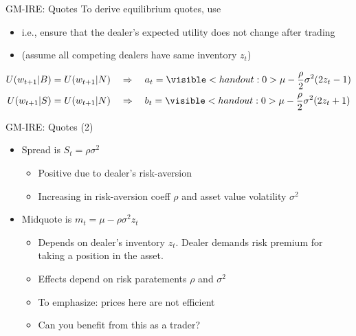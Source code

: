 \documentclass[english,10pt
,aspectratio=169
]{beamer}
\begin{document}
\begin{frame}{GM-IRE: Quotes}
	To derive equilibrium \alert{quotes}, use 
	\begin{itemize}
		\item i.e., ensure that the dealer's expected utility does not change after trading
		\item (assume all competing dealers have same inventory $z_t$)
	\end{itemize}
		\begin{align*}
			U(w_{t+1}|B)=U(w_{t+1}|N) \quad & \Rightarrow \quad a_t = \visible<handout:0>{ \mu -\frac{\rho}{2} \sigma^2 (2z_t - 1) }
			\\
			U(w_{t+1}|S)=U(w_{t+1}|N) \quad & \Rightarrow \quad b_t = \visible<handout:0>{ \mu -\frac{\rho}{2} \sigma^2 (2z_t + 1) }
		\end{align*}
\end{frame}


\begin{frame}{GM-IRE: Quotes (2)}
	\begin{itemize}
		\item \alert{Spread} is $S_t = \rho \sigma^2 $
		\begin{itemize}
			\item Positive due to dealer's risk-aversion
			\item Increasing in risk-aversion coeff $\rho$ and asset value volatility $\sigma^2$
		\end{itemize}
		\pause
		\item \alert{Midquote} is $m_t = \mu - \rho \sigma^2 z_t$
		\begin{itemize}
			\item Depends on dealer's inventory $z_t$. Dealer demands risk premium for taking a position in the asset.
			\item Effects depend on risk paratements $\rho$ and $\sigma^2$
			\item To emphasize: prices here are \alert{not efficient}
			\item Can you benefit from this as a trader? \pause {}
		\end{itemize}
	\end{itemize}
\end{frame}
\end{document}
